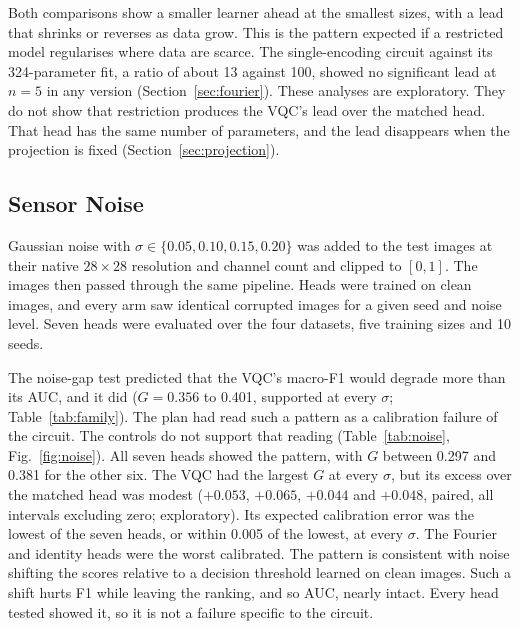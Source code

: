 \documentclass{ieeeaccess}
\newcommand{\vqc}{VQC}
\begin{document}
Both comparisons show a smaller learner ahead at the smallest sizes, with a lead that shrinks or reverses as data grow. This is the pattern expected if a restricted model regularises where data are scarce. The single-encoding circuit against its 324-parameter fit, a ratio of about 13 against 100, showed no significant lead at $n=5$ in any version (Section~\ref{sec:fourier}). These analyses are exploratory. They do not show that restriction produces the \vqc{}'s lead over the matched head. That head has the same number of parameters, and the lead disappears when the projection is fixed (Section~\ref{sec:projection}).

\subsection{Sensor Noise}
\label{sec:noise}
Gaussian noise with $\sigma\in\{0.05,0.10,0.15,0.20\}$ was added to the test images at their native $28\times28$ resolution and channel count and clipped to $[0,1]$. The images then passed through the same pipeline. Heads were trained on clean images, and every arm saw identical corrupted images for a given seed and noise level. Seven heads were evaluated over the four datasets, five training sizes and 10 seeds.

The noise-gap test predicted that the \vqc{}'s macro-F1 would degrade more than its AUC, and it did ($G=0.356$ to 0.401, supported at every $\sigma$; Table~\ref{tab:family}). The plan had read such a pattern as a calibration failure of the circuit. The controls do not support that reading (Table~\ref{tab:noise}, Fig.~\ref{fig:noise}). All seven heads showed the pattern, with $G$ between 0.297 and 0.381 for the other six. The \vqc{} had the largest $G$ at every $\sigma$, but its excess over the matched head was modest ($+0.053$, $+0.065$, $+0.044$ and $+0.048$, paired, all intervals excluding zero; exploratory). Its expected calibration error was the lowest of the seven heads, or within 0.005 of the lowest, at every $\sigma$. The Fourier and identity heads were the worst calibrated. The pattern is consistent with noise shifting the scores relative to a decision threshold learned on clean images. Such a shift hurts F1 while leaving the ranking, and so AUC, nearly intact. Every head tested showed it, so it is not a failure specific to the circuit.
\end{document}
